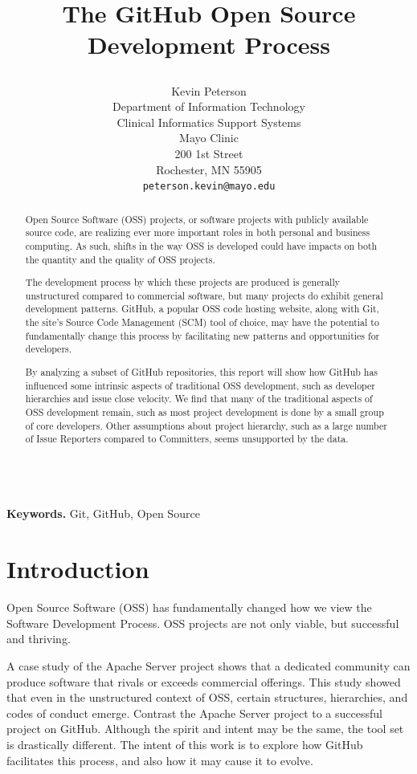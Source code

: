 \documentclass{proc}
\title{
The GitHub Open Source Development Process
\author{Kevin Peterson\\
Department of Information Technology\\
Clinical Informatics Support Systems\\
Mayo Clinic\\
200 1st Street\\
Rochester, MN  55905\\
\small \texttt{peterson.kevin@mayo.edu}
}
}
\begin{document}
\maketitle

\begin{abstract}
Open Source Software (OSS) projects, or software projects with publicly available source code, are realizing ever more important roles in both personal and business computing. As such, shifts in the way OSS is developed could have impacts on both the quantity and the quality of OSS projects.

The development process by which these projects are produced is generally unstructured compared to commercial software, but many projects do exhibit general development patterns. GitHub, a popular OSS code hosting website, along with Git, the site's Source Code Management (SCM) tool of choice, may have the potential to fundamentally change this process by facilitating new patterns and opportunities for developers.

By analyzing a subset of GitHub repositories, this report will show how GitHub has influenced some intrinsic aspects of traditional OSS development, such as developer hierarchies and issue close velocity. We find that many of the traditional aspects of OSS development remain, such as most project development is done by a small group of core developers. Other assumptions about project hierarchy, such as a large number of Issue Reporters compared to Committers, seems unsupported by the data.
\end{abstract}

\noindent \\\textbf{Keywords.} Git, GitHub, Open Source

\section{Introduction}
Open Source Software (OSS) has fundamentally changed how we view the Software Development Process\cite{raymond1999cathedral}. OSS projects are not only viable, but successful and thriving. 

A case study of the Apache Server project\cite{mockus2000case} shows that a dedicated community can produce software that rivals or exceeds commercial offerings. This study showed that even in the unstructured context of OSS, certain structures, hierarchies, and codes of conduct emerge. Contrast the Apache Server project to a successful project on GitHub. Although the spirit and intent may be the same, the tool set is drastically different. The intent of this work is to explore how GitHub facilitates this process, and also how it may cause it to evolve.
\end{document}
